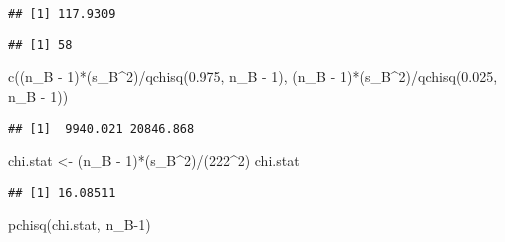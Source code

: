 \documentclass[
]{book}
\newenvironment{Shaded}{\begin{snugshade}}{\end{snugshade}}
\newcommand{\DecValTok}[1]{\textcolor[rgb]{0.00,0.00,0.81}{#1}}
\newcommand{\FloatTok}[1]{\textcolor[rgb]{0.00,0.00,0.81}{#1}}
\newcommand{\FunctionTok}[1]{\textcolor[rgb]{0.00,0.00,0.00}{#1}}
\newcommand{\NormalTok}[1]{#1}
\newcommand{\OtherTok}[1]{\textcolor[rgb]{0.56,0.35,0.01}{#1}}
\newcommand{\SpecialCharTok}[1]{\textcolor[rgb]{0.00,0.00,0.00}{#1}}
\newcommand{\StringTok}[1]{\textcolor[rgb]{0.31,0.60,0.02}{#1}}
\begin{document}
\begin{verbatim}
## [1] 117.9309
\end{verbatim}

\begin{Shaded}
\end{Shaded}

\begin{verbatim}
## [1] 58
\end{verbatim}

\begin{Shaded}
\begin{Highlighting}[]
\FunctionTok{c}\NormalTok{((n\_B }\SpecialCharTok{{-}} \DecValTok{1}\NormalTok{)}\SpecialCharTok{*}\NormalTok{(s\_B}\SpecialCharTok{\^{}}\DecValTok{2}\NormalTok{)}\SpecialCharTok{/}\FunctionTok{qchisq}\NormalTok{(}\FloatTok{0.975}\NormalTok{, n\_B }\SpecialCharTok{{-}} \DecValTok{1}\NormalTok{), (n\_B }\SpecialCharTok{{-}} \DecValTok{1}\NormalTok{)}\SpecialCharTok{*}\NormalTok{(s\_B}\SpecialCharTok{\^{}}\DecValTok{2}\NormalTok{)}\SpecialCharTok{/}\FunctionTok{qchisq}\NormalTok{(}\FloatTok{0.025}\NormalTok{, n\_B }\SpecialCharTok{{-}} \DecValTok{1}\NormalTok{))}
\end{Highlighting}
\end{Shaded}

\begin{verbatim}
## [1]  9940.021 20846.868
\end{verbatim}

\begin{Shaded}
\begin{Highlighting}[]
\NormalTok{chi.stat }\OtherTok{\textless{}{-}}\NormalTok{ (n\_B }\SpecialCharTok{{-}} \DecValTok{1}\NormalTok{)}\SpecialCharTok{*}\NormalTok{(s\_B}\SpecialCharTok{\^{}}\DecValTok{2}\NormalTok{)}\SpecialCharTok{/}\NormalTok{(}\DecValTok{222}\SpecialCharTok{\^{}}\DecValTok{2}\NormalTok{)}
\NormalTok{chi.stat}
\end{Highlighting}
\end{Shaded}

\begin{verbatim}
## [1] 16.08511
\end{verbatim}

\begin{Shaded}
\begin{Highlighting}[]
\FunctionTok{pchisq}\NormalTok{(chi.stat, n\_B}\DecValTok{{-}1}\NormalTok{)}
\end{Highlighting}
\end{Shaded}
\end{document}

